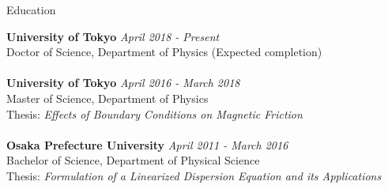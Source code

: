 \documentclass{resume} %
\begin{document}
\begin{rSection}{Education}

{\bf University of Tokyo} \hfill {\em April 2018 - Present} 
\\ Doctor of Science, Department of Physics (Expected completion)\\
\\{\bf University of Tokyo} \hfill {\em April 2016 - March 2018} 
\\ Master of Science, Department of Physics
\\ Thesis: \textit{Effects of Boundary Conditions on Magnetic Friction}\\
\\{\bf Osaka Prefecture University} \hfill {\em April 2011 - March 2016} 
\\ Bachelor of Science, Department of Physical Science
\\ Thesis: \textit{Formulation of a Linearized Dispersion Equation and its Applications}

\end{rSection}

\newpage
\end{document}
